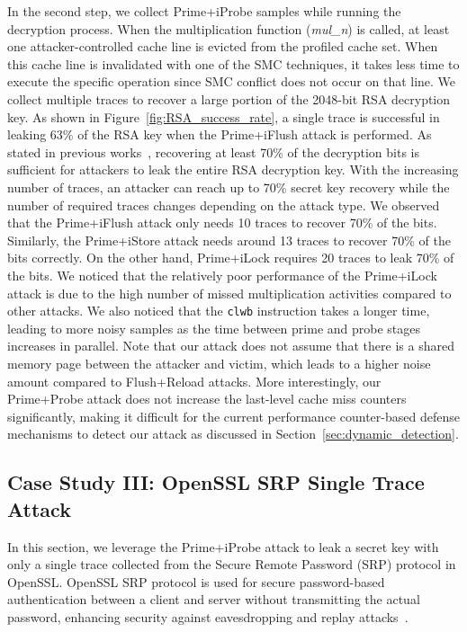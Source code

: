 In the second step, we collect Prime+iProbe samples while running the decryption process. When the multiplication function (\textit{mul\_n}) is called, at least one attacker-controlled cache line is evicted from the profiled cache set. When this cache line is invalidated with one of the SMC techniques, it takes less time to execute the specific operation since SMC conflict does not occur on that line. We collect multiple traces to recover a large portion of the 2048-bit RSA decryption key. As shown in Figure~\ref{fig:RSA_success_rate}, a single trace is successful in leaking 63\% of the RSA key when the Prime+iFlush attack is performed. As stated in previous works~\cite{yarom2014flush+,inci2015seriously}, recovering at least 70\% of the decryption bits is sufficient for attackers to leak the entire RSA decryption key. With the increasing number of traces, an attacker can reach up to 70\% secret key recovery while the number of required traces changes depending on the attack type. We observed that the Prime+iFlush attack only needs 10 traces to recover 70\% of the bits. Similarly, the Prime+iStore attack needs around 13 traces to recover 70\% of the bits correctly. On the other hand, Prime+iLock requires 20 traces to leak 70\% of the bits. We noticed that the relatively poor performance of the Prime+iLock attack is due to the high number of missed multiplication activities compared to other attacks. 
We also noticed that the \texttt{clwb} instruction takes a longer time, leading to more noisy samples as the time between prime and probe stages increases in parallel. 
Note that our attack does not assume that there is a shared memory page between the attacker and victim, which leads to a higher noise amount compared to Flush+Reload attacks. More interestingly, our Prime+Probe attack does not increase the last-level cache miss counters significantly, making it difficult for the current performance counter-based defense mechanisms to detect our attack as discussed in Section~\ref{sec:dynamic_detection}.



\subsection{Case Study III: OpenSSL SRP Single Trace Attack}\label{subsec:case3}
In this section, we leverage the Prime+iProbe attack to leak a secret key with only a single trace collected from the Secure Remote Password (SRP) protocol in OpenSSL. OpenSSL SRP protocol is used for secure password-based authentication between a client and server without transmitting the actual password, enhancing security against eavesdropping and replay attacks~\cite{wu1998secure,taylor2007using}. 

